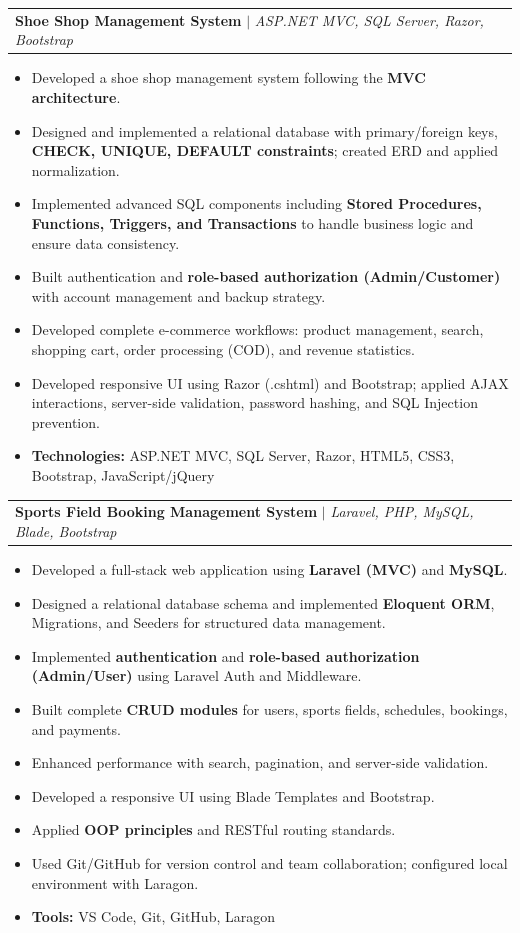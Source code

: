 \documentclass[letterpaper,11pt]{article}
\makeatletter
\newcommand{\resumeItem}[1]{
  \item\small{
    {#1 \vspace{-2pt}}
  }
}
\newcommand{\resumeProjectHeading}[2]{
    \item
    \begin{tabular*}{0.97\textwidth}{l@{\extracolsep{\fill}}r}
      \small#1 & #2 \\
    \end{tabular*}\vspace{-7pt}
}
\newcommand{\resumeItemListStart}{\begin{itemize}}
\newcommand{\resumeItemListEnd}{\end{itemize}\vspace{-5pt}}
\makeatother
\begin{document}
        \vspace{8pt}
      \resumeProjectHeading
        {\textbf{Shoe Shop Management System} $|$ \emph{ASP.NET MVC, SQL Server, Razor, Bootstrap}}{}
        \resumeItemListStart
            \resumeItem{Developed a shoe shop management system following the \textbf{MVC architecture}.}
            \resumeItem{Designed and implemented a relational database with primary/foreign keys, \textbf{CHECK, UNIQUE, DEFAULT constraints}; created ERD and applied normalization.}
            \resumeItem{Implemented advanced SQL components including \textbf{Stored Procedures, Functions, Triggers, and Transactions} to handle business logic and ensure data consistency.}
            \resumeItem{Built authentication and \textbf{role-based authorization (Admin/Customer)} with account management and backup strategy.}
            \resumeItem{Developed complete e-commerce workflows: product management, search, shopping cart, order processing (COD), and revenue statistics.}
            \resumeItem{Developed responsive UI using Razor (.cshtml) and Bootstrap; applied AJAX interactions, server-side validation, password hashing, and SQL Injection prevention.}
            \resumeItem{\textbf{Technologies:} ASP.NET MVC, SQL Server, Razor, HTML5, CSS3, Bootstrap, JavaScript/jQuery}
        \resumeItemListEnd



        \vspace{8pt}          
        \resumeProjectHeading
        {\textbf{Sports Field Booking Management System} $|$ \emph{Laravel, PHP, MySQL, Blade, Bootstrap}}{}
        \resumeItemListStart
            \resumeItem{Developed a full-stack web application using \textbf{Laravel (MVC)} and \textbf{MySQL}.}
            \resumeItem{Designed a relational database schema and implemented \textbf{Eloquent ORM}, Migrations, and Seeders for structured data management.}
            \resumeItem{Implemented \textbf{authentication} and \textbf{role-based authorization (Admin/User)} using Laravel Auth and Middleware.}
            \resumeItem{Built complete \textbf{CRUD modules} for users, sports fields, schedules, bookings, and payments.}
            \resumeItem{Enhanced performance with search, pagination, and server-side validation.}
            \resumeItem{Developed a responsive UI using Blade Templates and Bootstrap.}
            \resumeItem{Applied \textbf{OOP principles} and RESTful routing standards.}
            \resumeItem{Used Git/GitHub for version control and team collaboration; configured local environment with Laragon.}
            \resumeItem{\textbf{Tools:} VS Code, Git, GitHub, Laragon}
        \resumeItemListEnd
\end{document}
